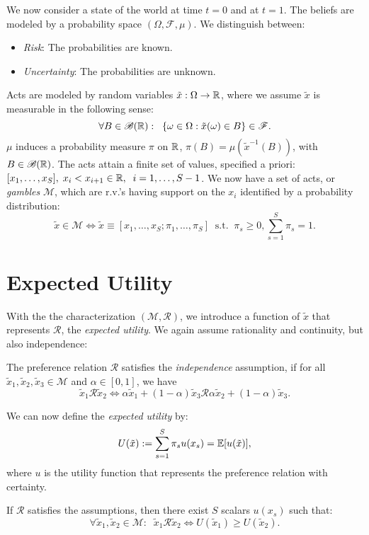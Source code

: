 \documentclass[twoside]{article}
\begin{document}
We now consider a state of the world at time $t=0$ and at $t=1$. The beliefs are modeled by a probability space $(\Omega, \mathcal{F}, \mu)$. We distinguish between:
\begin{itemize}
    \item \textit{Risk}: The probabilities are known.
    \item \textit{Uncertainty}: The probabilities are unknown.
\end{itemize}
Acts are modeled by random variables $\tilde{x}: \Omega \rightarrow \mathbb{R}$, where we assume $\tilde{x}$ is measurable in the following sense:
\[
    \forall B \in \mathcal{B}(\mathbb{R}) : \;\; \{ \omega \in \Omega : \tilde{x}(\omega) \in B \} \in \mathcal{F}.
\]
$\mu$ induces a probability measure $\pi$ on $\mathbb{R}$, $\pi(B) = \mu(\tilde{x}^{-1}(B))$, with $B \in \mathcal{B}(\mathbb{R})$. The acts attain a finite set of values, specified a priori: $ [ x_1, \dots, x_S ], \; x_i < x_{i+1} \in \mathbb{R}, \;\; i = 1, \dots, S - 1$. We now have a set of acts, or \textit{gambles} $\mathcal{M}$, which are r.v.'s having support on the $x_i$ identified by a probability distribution:
\[
    \tilde{x} \in \mathcal{M} \iff \tilde{x} \equiv [x_1, \dots, x_S ; \pi_1, \dots, \pi_S] \;\; \text{s.t.} \;\; \pi_s \geq 0, \sum^S_{s=1}\pi_s = 1.
\]


\section{Expected Utility}
With the the characterization $(\mathcal{M}, \mathcal{R})$, we introduce a function of $\tilde{x}$ that represents $\mathcal{R}$, the \textit{expected utility}. We again assume rationality and continuity, but also independence:

\begin{assumption}[Independence]
    The preference relation $\mathcal{R}$ satisfies the \textit{independence} assumption, if for all $\tilde{x}_1, \tilde{x}_2, \tilde{x}_3 \in \mathcal{M}$ and $\alpha \in [0,1]$, we have
    \[
        \tilde{x}_1 \mathcal{R} \tilde{x}_2 \iff \alpha \tilde{x}_1 + (1 - \alpha)\tilde{x}_3 \mathcal{R} \alpha \tilde{x}_2 + (1 - \alpha)\tilde{x}_3.
    \]
\end{assumption}
We can now define the \textit{expected utility} by:
\[
    U(\tilde{x}) := \sum^S_{s=1}\pi_s u(x_s) = \mathbb{E}[u(\tilde{x})],
\]
where $u$ is the utility function that represents the preference relation with certainty.

\begin{theorem}[Theorem 2.1]
    If $\mathcal{R}$ satisfies the assumptions, then there exist $S$ scalars $u(x_s)$ such that:
    \[
        \forall \tilde{x}_1, \tilde{x}_2 \in \mathcal{M} : \;\; \tilde{x}_1 \mathcal{R} \tilde{x}_2 \iff U(\tilde{x}_1) \geq U(\tilde{x}_2).
    \]
\end{theorem}
\end{document}
